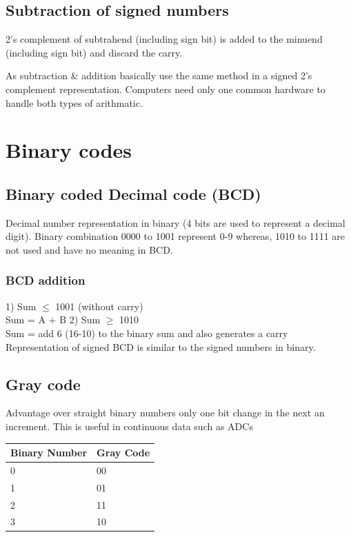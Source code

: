 \subsection{Subtraction of signed numbers}
2's complement of subtrahend (including sign bit) is added to the minuend (including sign bit) and discard the carry. 

As subtraction \& addition basically use the same method in a signed 2's complement representation. Computers need only one common hardware to handle both types of arithmatic.

\clearpage
\section{Binary codes}
\subsection{Binary coded Decimal code (BCD)}
Decimal number representation in binary (4 bits are used to represent a decimal digit). Binary combination 0000 to 1001 represent 0-9 whereas, 1010 to 1111 are not used and have no meaning in BCD.\\
\subsubsection{BCD addition}
1) Sum \( \leqslant \) 1001 (without carry)\\
\quad Sum = A + B
2) Sum \( \geqslant \) 1010\\ 
Sum = add 6 (16-10) to the binary sum and also generates a carry\\ Representation of signed BCD is similar to the signed numbers in binary.

\subsection{Gray code}
Advantage over straight binary numbers only one bit change in the next an increment. This is useful in continuous data such as ADCs 
\begin{table}[H]
\centering
\begin{tabular}{ll}
\hline
\multicolumn{1}{|l|}{\textbf{Binary Number}} & \multicolumn{1}{l|}{\textbf{Gray Code}} \\ \hline
\multicolumn{1}{|l|}{0} & \multicolumn{1}{l|}{00} \\ \hline
\multicolumn{1}{|l|}{1} & \multicolumn{1}{l|}{01} \\ \hline
\multicolumn{1}{|l|}{2} & \multicolumn{1}{l|}{11} \\ \hline
\multicolumn{1}{|l|}{3} & \multicolumn{1}{l|}{10} \\ \hline
\end{tabular}
\end{table}

